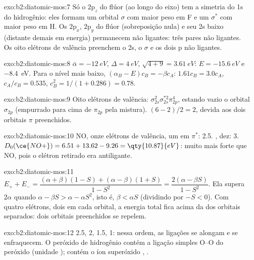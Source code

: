 \begin{solution}{exo:b2:diatomic-mos:7}
Só o $2\mathrm p_z$ do flúor (ao longo do eixo) tem a simetria do 1s do
hidrogênio: eles formam um orbital $\sigma$ com maior peso em F e um $\sigma^*$
com maior peso em H. Os $2\mathrm p_x$, $2\mathrm p_y$ do flúor (sobreposição
nula) e seu 2s baixo (distante demais em energia) permanecem não ligantes:
três pares não ligantes. Os oito elétrons de valência preenchem o 2s, o
$\sigma$ e os dois p não ligantes.
\end{solution}

\begin{solution}{exo:b2:diatomic-mos:8}
$\bar\alpha = \qty{-12}{eV}$, $\Delta = \qty{4}{eV}$, $\sqrt{4 + 9} = \qty{3.61}{eV}$:
$E = \qty{-15.6}{eV}$ e \qty{-8.4}{eV}. Para o nível mais baixo, $(\alpha_B - E)c_B = -\beta
c_A$: $1.61c_B = 3.0c_A$, $c_A/c_B = 0.535$, $c_B^2 = 1/(1 + 0.286) = 0.78$.
\end{solution}

\begin{solution}{exo:b2:diatomic-mos:9}
Oito elétrons de valência: $\sigma_{2s}^2\sigma_{2s}^{*2}\pi_{2p}^4$, estando vazio o orbital
$\sigma_{2p}$ (empurrado para cima de $\pi_{2p}$ pela mistura). 
$(6 - 2)/2 = 2$, devida aos dois orbitais $\pi$ preenchidos.
\end{solution}

\begin{solution}{exo:b2:diatomic-mos:10}
NO, onze elétrons de valência, um em $\pi^*$:  2.5. , dez:  3. $D_0(\ce{NO+}) = 6.51 + 13.62 - 9.26 = \qty{10.87}{eV}$: muito mais forte
que NO, pois o elétron retirado era antiligante.
\end{solution}

\begin{solution}{exo:b2:diatomic-mos:11}
$E_+ + E_- = \dfrac{(\alpha + \beta)(1 - S) + (\alpha - \beta)(1 + S)}{1 - S^2} = \dfrac{2(\alpha -
\beta S)}{1 - S^2}$. Ela supera $2\alpha$ quando $\alpha - \beta S > \alpha - \alpha S^2$, isto é,
$\beta < \alpha S$ (dividindo por $-S < 0$). Com quatro elétrons, dois em cada orbital,
a energia total fica acima da dos orbitais separados: dois orbitais preenchidos
se repelem.
\end{solution}

\begin{solution}{exo:b2:diatomic-mos:12}
 2.5, 2, 1.5, 1: nessa ordem, as ligações se alongam e se
enfraquecem. O peróxido de hidrogênio contém a ligação simples O--O do
peróxido (unidade );  contém o íon superóxido ,
.
\end{solution}

